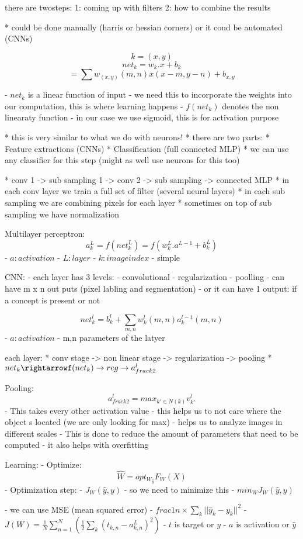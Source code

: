 there are twosteps:
1: coming up with filters
2: how to combine the results

* could be done manually (harris or hessian corners) or it coud be automated (CNNs)

\[k = (x,y)\]
\[net_k = w_k . x + b_k\]
\[ = \sum w_{(x,y)}(m,n) x(x-m, y-n) + b_{x,y}\]

- $net_k$ is a linear function of input
 - we need this to incorporate the weights into our computation, this is where learning happens
- $f(net_k)$ denotes the non linearaty function
 - in our case we use sigmoid, this is for activation purpose

* this is very similar to what we do with neurons!
* there are two parts:
 * Feature extractions (CNNs)
 * Classification (full connected MLP)
  * we can use any classifier for this step (might as well use neurons for this too)

* conv 1 -> sub sampling 1 -> conv 2 -> sub sampling -> connected MLP
 * in each conv layer we train a full set of filter (several neural layers)
 * in each sub sampling we are combining pixels for each layer
 * sometimes on top of sub sampling we have normalization

Multilayer perceptron:
\[a ^L_k = f(net^L_k) = f(w^L_k . a ^ {L-1} + b^L_k)\]
- $a: activation$
- $L: layer$
- $k: image index$
- simple


CNN:
- each layer has 3 levels:
 - convolutional
 - regularization
 - poolling
- can have m x n out puts (pixel labling and segmentation)
 - or it can have 1 output: if a concept is present or not

\[net^l_k = b^l_k + \sum_{m,n} w^l_k(m,n) a^{l-1}_k(m,n)\]
- $a: activation$
- m,n parameters of the latyer

each layer:
* conv stage -> non linear stage -> regularization -> pooling
* $ net_k \rightarrowf (net_k) \rightarrow reg \rightarrow  a^l_{frac{k}{2}} $

Pooling:
 \[a^l_{frac{k}{2}} = max_{k' \in N(k)} v^l_{k'}\]
- This takes every other activation value
- this helps us to not care where the object s located (we are only looking for max)
 - helps us to analyze images in different scales
  - This is done to  reduce the amount of parameters that need to be computed
  - it also helps with overfitting

Learning:
- Optimize:
\[\hat{W} = opt_{W_\hat{y}} F_W(X)\]
- Optimization step:
 - $J_W(\hat{y}, y)$
- so we need to minimize this
 - $min_W J_W(\hat{y}, y)$

- we can use MSE (mean squared error)
 - $frac{1}{n} \times \sum_k|| \hat{y}_k - y_k ||^2$
 - $J(W) = \frac{1}{N}\sum^N_{n=1}(\frac{1}{2}\sum_k(t_{k,n} - a^L_{k,n})^2)$
 - $t$ is target or $y$
 - $a$ is activation or $\hat{y}$

